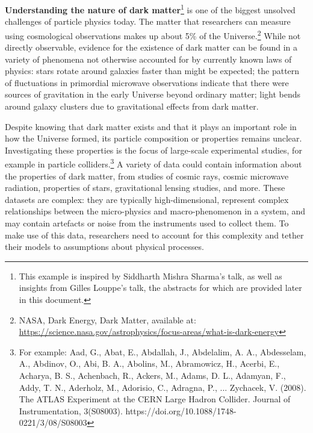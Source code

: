 \textbf{Understanding the nature of dark matter}\footnote{This example
  is inspired by Siddharth Mishra Sharma's talk, as well as insights
  from Gilles Louppe's talk, the abstracts for which are provided later
  in this document.} is one of the biggest unsolved challenges of
particle physics today. The matter that researchers can measure using
cosmological observations makes up about 5\% of the Universe.\footnote{NASA,
  Dark Energy, Dark Matter, available at:
  \href{https://science.nasa.gov/astrophysics/focus-areas/what-is-dark-energy}{\uline{https://science.nasa.gov/astrophysics/focus-areas/what-is-dark-energy}}}
While not directly observable, evidence for the existence of dark matter
can be found in a variety of phenomena not otherwise accounted for by
currently known laws of physics: stars rotate around galaxies faster
than might be expected; the pattern of fluctuations in primordial
microwave observations indicate that there were sources of gravitation
in the early Universe beyond ordinary matter; light bends around galaxy
clusters due to gravitational effects from dark matter.~

Despite knowing that dark matter exists and that it plays an important
role in how the Universe formed, its particle composition or properties
remains unclear. Investigating these properties is the focus of
large-scale experimental studies, for example in particle
colliders.\footnote{For example: Aad, G., Abat, E., Abdallah, J.,
  Abdelalim, A. A., Abdesselam, A., Abdinov, O., Abi, B. A., Abolins,
  M., Abramowicz, H., Acerbi, E., Acharya, B. S., Achenbach, R., Ackers,
  M., Adams, D. L., Adamyan, F., Addy, T. N., Aderholz, M., Adorisio,
  C., Adragna, P., ... Zychacek, V. (2008). The ATLAS Experiment at the
  CERN Large Hadron Collider. Journal of Instrumentation, 3(S08003).
  https://doi.org/10.1088/1748-0221/3/08/S08003} A variety of data could
contain information about the properties of dark matter, from studies of
cosmic rays, cosmic microwave radiation, properties of stars,
gravitational lensing studies, and more. These datasets are complex:
they are typically high-dimensional, represent complex relationships
between the micro-physics and macro-phenomenon in a system, and may
contain artefacts or noise from the instruments used to collect them. To
make use of this data, researchers need to account for this complexity
and tether their models to assumptions about physical processes.

